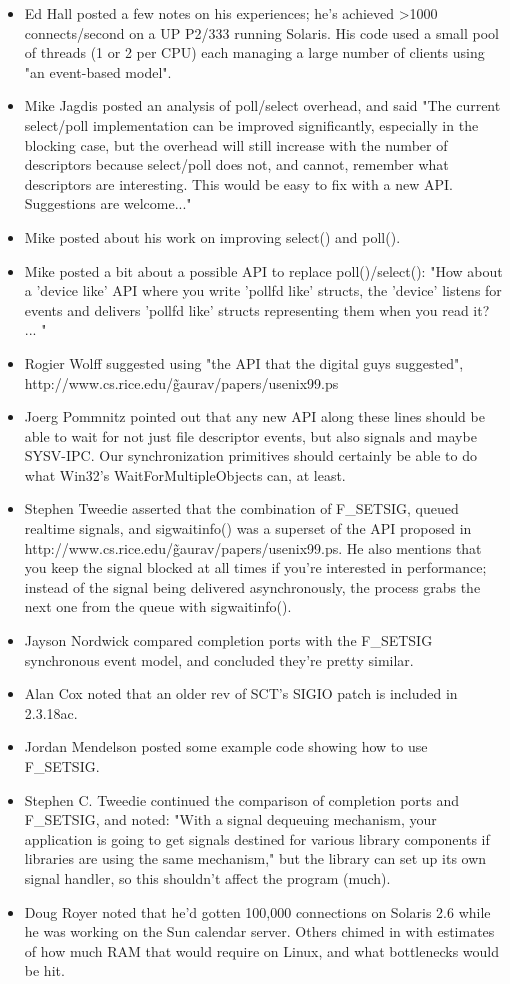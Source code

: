 \documentclass[12pt, twoside, a4paper, xetex]{report}
\begin{document}
\begin{itemize}
\item Ed Hall posted a few notes on his experiences; he's achieved >1000 connects/second on a UP P2/333 running Solaris. His code used a small pool of threads (1 or 2 per CPU) each managing a large number of clients using "an event-based model".
\item Mike Jagdis posted an analysis of poll/select overhead, and said "The current select/poll implementation can be improved significantly, especially in the blocking case, but the overhead will still increase with the number of descriptors because select/poll does not, and cannot, remember what descriptors are interesting. This would be easy to fix with a new API. Suggestions are welcome..."
\item Mike posted about his work on improving select() and poll().
\item Mike posted a bit about a possible API to replace poll()/select(): "How about a 'device like' API where you write 'pollfd like' structs, the 'device' listens for events and delivers 'pollfd like' structs representing them when you read it? ... "
\item Rogier Wolff suggested using "the API that the digital guys suggested", \\http://www.cs.rice.edu/\~gaurav/papers/usenix99.ps
\item Joerg Pommnitz pointed out that any new API along these lines should be able to wait for not just file descriptor events, but also signals and maybe SYSV-IPC. Our synchronization primitives should certainly be able to do what Win32's WaitForMultipleObjects can, at least.
\item Stephen Tweedie asserted that the combination of F\_SETSIG, queued realtime signals, and sigwaitinfo() was a superset of the API proposed in http://www.cs.rice.edu/\~gaurav/papers/usenix99.ps. He also mentions that you keep the signal blocked at all times if you're interested in performance; instead of the signal being delivered asynchronously, the process grabs the next one from the queue with sigwaitinfo().
\item Jayson Nordwick compared completion ports with the F\_SETSIG synchronous event model, and concluded they're pretty similar.
\item Alan Cox noted that an older rev of SCT's SIGIO patch is included in 2.3.18ac.
\item Jordan Mendelson posted some example code showing how to use F\_SETSIG.
\item Stephen C. Tweedie continued the comparison of completion ports and F\_SETSIG, and noted: "With a signal dequeuing mechanism, your application is going to get signals destined for various library components if libraries are using the same mechanism," but the library can set up its own signal handler, so this shouldn't affect the program (much).
\item Doug Royer noted that he'd gotten 100,000 connections on Solaris 2.6 while he was working on the Sun calendar server. Others chimed in with estimates of how much RAM that would require on Linux, and what bottlenecks would be hit.
\end{itemize}
\end{document}
